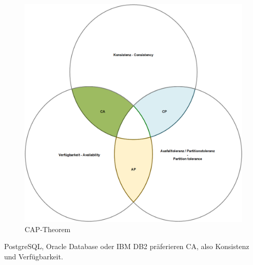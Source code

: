 \begin{flushleft}
    \begin{figure}[H]
        \centering
        \includegraphics[width=1\linewidth]{source/implementation/evaluation/excursus_architecture/cap_theorem}
        \caption{CAP-Theorem}
        \label{fig:cap_theorem}
    \end{figure}

    \Gls{PostgreSQL}, \Gls{Oracle Database} oder \Gls{IBM DB2} präferieren CA, also Konsistenz und Verfügbarkeit.
\end{flushleft}